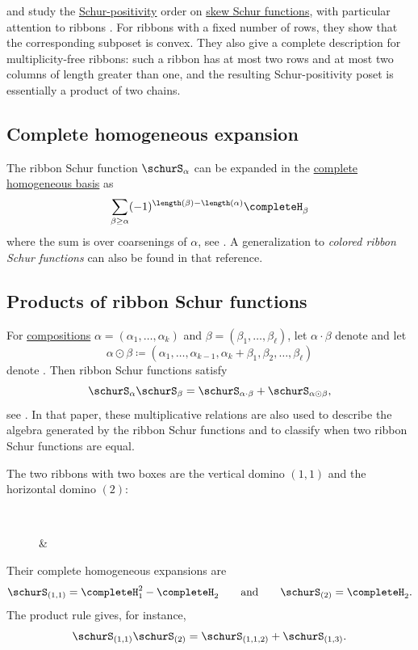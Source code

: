  and  study the
\hyperref[schurPositivity]{Schur-positivity} order on
\hyperref[schurSkew]{skew Schur functions}, with particular attention to
ribbons \cite{McNamaraWilligenburg2009Ribbon}.
For ribbons with a fixed
number of rows, they show that the corresponding subposet is convex.  They
also give a complete description for multiplicity-free ribbons: such a
ribbon has at most two rows and at most two columns of length greater than
one, and the resulting Schur-positivity poset is essentially a product of
two chains.

\subsection[schurRibbonIntoH]{Complete homogeneous expansion}

The ribbon Schur function $\schurS_\alpha$ can be expanded in the
\hyperref[completeH]{complete homogeneous basis} as
\[
   \sum_{\beta \geq \alpha} (-1)^{\length(\beta)-\length(\alpha)}\completeH_{\beta}
\]
where the sum is over coarsenings of $\alpha$, see \cite{Moustakas2023x}.
A generalization to \emph{colored ribbon Schur functions} can also be found in that reference.

\subsection[schurRibbonProduct]{Products of ribbon Schur functions}

For \hyperref[compositions]{compositions} $\alpha=(\alpha_1,\dotsc,\alpha_k)$ and
$\beta=(\beta_1,\dotsc,\beta_\ell)$, let
$\alpha\cdot\beta$ denote  and let
\[
  \alpha\odot\beta
  \coloneqq (\alpha_1,\dotsc,\alpha_{k-1},\alpha_k+\beta_1,\beta_2,\dotsc,\beta_\ell)
\]
denote .  Then ribbon Schur functions satisfy
\[
  \schurS_\alpha\schurS_\beta
  =
  \schurS_{\alpha\cdot\beta}+\schurS_{\alpha\odot\beta},
\]
see \cite{BilleraThomasWilligenburg2006}.  In that paper, these
multiplicative relations are also used to describe the algebra generated by
the ribbon Schur functions and to classify when two ribbon Schur functions are
equal.

\begin{example}
The two ribbons with two boxes are the vertical domino $(1,1)$ and the
horizontal domino $(2)$:
\begin{figure}
\begin{ytableau}
{}\\
{}
\end{ytableau}
\begin{ytableau}
{} & {}
\end{ytableau}
\end{figure}
Their complete homogeneous expansions are
\[
  \schurS_{(1,1)}=\completeH_1^2-\completeH_2
  \qquad\text{and}\qquad
  \schurS_{(2)}=\completeH_2.
\]
The product rule gives, for instance,
\[
  \schurS_{(1,1)}\schurS_{(2)}
  =
  \schurS_{(1,1,2)}+\schurS_{(1,3)}.
\]
\end{example}
